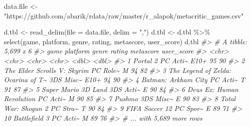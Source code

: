 \documentclass[
]{book}
\newenvironment{Shaded}{\begin{snugshade}}{\end{snugshade}}
\newcommand{\AttributeTok}[1]{\textcolor[rgb]{0.77,0.63,0.00}{#1}}
\newcommand{\CommentTok}[1]{\textcolor[rgb]{0.56,0.35,0.01}{\textit{#1}}}
\newcommand{\FunctionTok}[1]{\textcolor[rgb]{0.00,0.00,0.00}{#1}}
\newcommand{\NormalTok}[1]{#1}
\newcommand{\OtherTok}[1]{\textcolor[rgb]{0.56,0.35,0.01}{#1}}
\newcommand{\SpecialCharTok}[1]{\textcolor[rgb]{0.00,0.00,0.00}{#1}}
\newcommand{\StringTok}[1]{\textcolor[rgb]{0.31,0.60,0.02}{#1}}
\begin{document}
\begin{Shaded}
\begin{Highlighting}[]
\NormalTok{data.file }\OtherTok{\textless{}{-}} \StringTok{"https://github.com/abarik/rdata/raw/master/r\_alapok/metacritic\_games.csv"}

\NormalTok{d.tbl }\OtherTok{\textless{}{-}} \FunctionTok{read\_delim}\NormalTok{(}\AttributeTok{file =}\NormalTok{ data.file, }\AttributeTok{delim =} \StringTok{","}\NormalTok{)}
\NormalTok{d.tbl }\OtherTok{\textless{}{-}}\NormalTok{ d.tbl }\SpecialCharTok{\%\textgreater{}\%} \FunctionTok{select}\NormalTok{(game, platform, genre, rating, metascore, user\_score)}
\NormalTok{d.tbl}
\CommentTok{\#\textgreater{} \# A tibble: 5,699 x 6}
\CommentTok{\#\textgreater{}    game                               platform genre rating metascore user\_score}
\CommentTok{\#\textgreater{}    \textless{}chr\textgreater{}                              \textless{}chr\textgreater{}    \textless{}chr\textgreater{} \textless{}chr\textgreater{}      \textless{}dbl\textgreater{}      \textless{}dbl\textgreater{}}
\CommentTok{\#\textgreater{}  1 Portal 2                           PC       Acti\textasciitilde{} E10+          95         90}
\CommentTok{\#\textgreater{}  2 The Elder Scrolls V: Skyrim        PC       Role\textasciitilde{} M             94         82}
\CommentTok{\#\textgreater{}  3 The Legend of Zelda: Ocarina of T\textasciitilde{} 3DS      Misc\textasciitilde{} E10+          94         90}
\CommentTok{\#\textgreater{}  4 Batman: Arkham City                PC       Acti\textasciitilde{} T             91         87}
\CommentTok{\#\textgreater{}  5 Super Mario 3D Land                3DS      Acti\textasciitilde{} E             90         84}
\CommentTok{\#\textgreater{}  6 Deus Ex: Human Revolution          PC       Acti\textasciitilde{} M             90         85}
\CommentTok{\#\textgreater{}  7 Pushmo                             3DS      Misc\textasciitilde{} E             90         83}
\CommentTok{\#\textgreater{}  8 Total War: Shogun 2                PC       Stra\textasciitilde{} T             90         84}
\CommentTok{\#\textgreater{}  9 FIFA Soccer 12                     PC       Spor\textasciitilde{} E             89         71}
\CommentTok{\#\textgreater{} 10 Battlefield 3                      PC       Acti\textasciitilde{} M             89         76}
\CommentTok{\#\textgreater{} \# ... with 5,689 more rows}


\end{Highlighting}
\end{Shaded}
\end{document}
